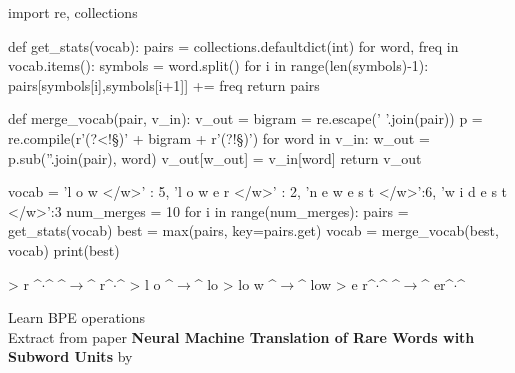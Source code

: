 \begin{algorithm}[!h]
\begin{python}
import re, collections

def get_stats(vocab):
    pairs = collections.defaultdict(int)
    for word, freq in vocab.items():
    symbols = word.split()
    for i in range(len(symbols)-1):
        pairs[symbols[i],symbols[i+1]] += freq
    return pairs

def merge_vocab(pair, v_in):
    v_out = {}
    bigram = re.escape(' '.join(pair))
    p = re.compile(r'(?<!\S)' + bigram + r'(?!\S)')
    for word in v_in:
    w_out = p.sub(''.join(pair), word)
    v_out[w_out] = v_in[word]
    return v_out

vocab = {'l o w </w>' : 5, 'l o w e r </w>' : 2,
            'n e w e s t </w>':6, 'w i d e s t </w>':3}
num_merges = 10
for i in range(num_merges):
    pairs = get_stats(vocab)
    best = max(pairs, key=pairs.get)
    vocab = merge_vocab(best, vocab)
    print(best)

> r ^$\cdot$^ ^$\rightarrow$^ r^$\cdot$^
> l o ^$\rightarrow$^ lo
> lo w ^$\rightarrow$^ low
> e r^$\cdot$^ ^$\rightarrow$^ er^$\cdot$^
\end{python}
\caption{Learn BPE operations \\ Extract from paper \textbf{Neural Machine Translation of Rare Words with Subword Units} by \citep{sennrich2016}}
\label{bpe-algorithm}
\end{algorithm}
